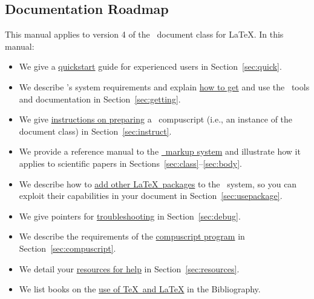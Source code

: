 \documentclass[%
prl%
,twocolumngrid%
,secnumarabic%
,amssymb]{revtex4}
\begin{document}
\subsection{Documentation Roadmap}

This manual applies to version 4 of the \revtex\ document class for \LaTeX.
In this manual:
\begin{itemize}
\item
We give a \hyperlink{Tsec:quick}{quickstart} guide for experienced users in Section~\ref{sec:quick}.

\item
We describe \revtex's system requirements and explain 
\hyperlink{Tsec:getting}{how to get} and use the \revtex\ tools and documentation
in Section~\ref{sec:getting}.

\item
We give \hyperlink{Tsec:instruct}{instructions on preparing} a \revtex\ compuscript (i.e., an instance of
the  document class) in Section~\ref{sec:instruct}.

\item
We provide a reference manual to the \hyperlink{Tsec:markup}{\revtex\ markup system} and
illustrate how it applies to scientific papers in Sections~\ref{sec:class}--\ref{sec:body}.

\item
We describe how to \hyperlink{Tsec:usepackage}{add other \LaTeX\ packages} to the \revtex\ system,
so you can exploit their capabilities in your document in Section~\ref{sec:usepackage}.

\item
We give pointers for
\hyperlink{Tsec:debug}{troubleshooting} in Section~\ref{sec:debug}.

\item
We describe the requirements of the \hyperlink{Tsec:compuscript}{compuscript program} in Section~\ref{sec:compuscript}.

\item
We detail your \hyperlink{Tsec:resources}{resources for help} in Section~\ref{sec:resources}.

\item
We list books on the \hyperlink{Tsec:TeXbooks}{use of \TeX\ and \LaTeX} in the Bibliography.

\end{itemize}
\end{document}
